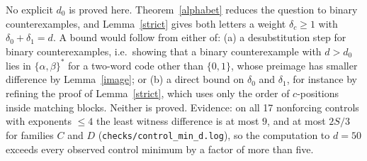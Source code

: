 \begin{remark}\label{gap}
No explicit \(d_0\) is proved here. Theorem~\ref{alphabet} reduces the question to binary counterexamples, and Lemma~\ref{strict} gives both letters a weight \(\delta_c\ge1\) with \(\delta_0+\delta_1=d\). A bound would follow from either of: (a) a desubstitution step for binary counterexamples, i.e.\ showing that a binary counterexample with \(d>d_0\) lies in \(\{\alpha,\beta\}^*\) for a two-word code other than \(\{0,1\}\), whose preimage has smaller difference by Lemma~\ref{image}; or (b) a direct bound on \(\delta_0\) and \(\delta_1\), for instance by refining the proof of Lemma~\ref{strict}, which uses only the order of \(c\)-positions inside matching blocks. Neither is proved. Evidence: on all 17 nonforcing controls with exponents \(\le4\) the least witness difference is at most \(9\), and at most \(2S/3\) for families \(C\) and \(D\) (\texttt{checks/control\_min\_d.log}), so the computation to \(d=50\) exceeds every observed control minimum by a factor of more than five.
\end{remark}
